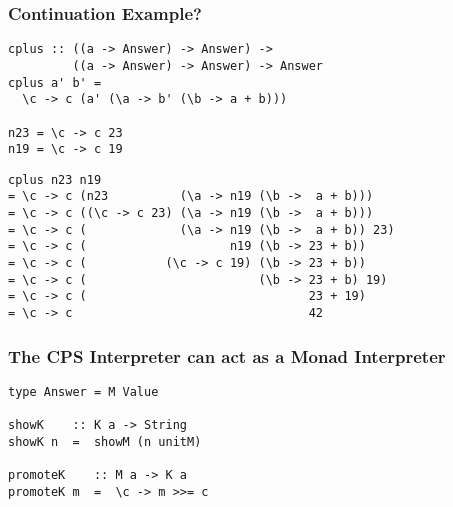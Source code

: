 \documentclass{beamer}
\newcommand{\bind}{\texttt{>>=}}
\begin{document}

\begin{frame}[fragile]
\frametitle{Continuation Example?}

\lstset{basicstyle=\footnotesize\ttfamily}
\begin{lstlisting}
cplus :: ((a -> Answer) -> Answer) -> 
         ((a -> Answer) -> Answer) -> Answer
cplus a' b' = 
  \c -> c (a' (\a -> b' (\b -> a + b)))

n23 = \c -> c 23
n19 = \c -> c 19

\end{lstlisting}
\pause
\begin{lstlisting}
cplus n23 n19 
= \c -> c (n23          (\a -> n19 (\b ->  a + b))) 
= \c -> c ((\c -> c 23) (\a -> n19 (\b ->  a + b)))
= \c -> c (             (\a -> n19 (\b ->  a + b)) 23)
= \c -> c (                    n19 (\b -> 23 + b))
= \c -> c (           (\c -> c 19) (\b -> 23 + b))
= \c -> c (                        (\b -> 23 + b) 19)
= \c -> c (                               23 + 19)
= \c -> c                                 42
\end{lstlisting}
\lstset{language=Haskell}


\end{frame}




\begin{frame}[fragile]
\frametitle{The CPS Interpreter can act as a Monad Interpreter}

\begin{lstlisting}
type Answer = M Value

showK    :: K a -> String
showK n  =  showM (n unitM)

promoteK    :: M a -> K a
promoteK m  =  \c -> m >>= c
\end{lstlisting}


\end{frame}
\end{document}
